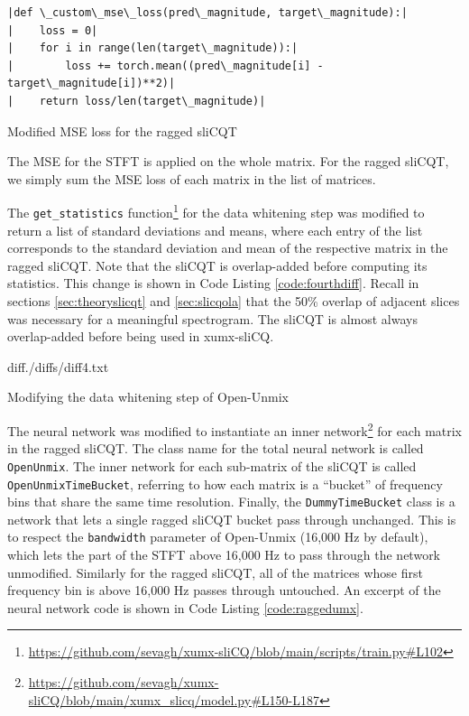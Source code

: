 \documentclass[report.tex]{subfiles}
\begin{document}
\begin{listing}[h]
  \centering
\begin{verbatim}
|def \_custom\_mse\_loss(pred\_magnitude, target\_magnitude):|
|    loss = 0|
|    for i in range(len(target\_magnitude)):|
|        loss += torch.mean((pred\_magnitude[i] - target\_magnitude[i])**2)|
|    return loss/len(target\_magnitude)|
\end{verbatim}
  \caption{Modified MSE loss for the ragged sliCQT}
  \label{code:simplemse}
\end{listing}

The MSE for the STFT is applied on the whole matrix. For the ragged sliCQT, we simply sum the MSE loss of each matrix in the list of matrices.

The \Verb#get_statistics# function\footnote{\url{https://github.com/sevagh/xumx-sliCQ/blob/main/scripts/train.py\#L102}} for the data whitening step was modified to return a list of standard deviations and means, where each entry of the list corresponds to the standard deviation and mean of the respective matrix in the ragged sliCQT. Note that the sliCQT is overlap-added before computing its statistics. This change is shown in Code Listing \ref{code:fourthdiff}. Recall in sections \ref{sec:theoryslicqt} and \ref{sec:slicqola} that the 50\% overlap of adjacent slices was necessary for a meaningful spectrogram. The sliCQT is almost always overlap-added before being used in xumx-sliCQ.

\begin{listing}[ht]
  \centering
\begin{inputminted}[linenos,breaklines,frame=single,fontsize=\scriptsize]{diff}{./diffs/diff4.txt}
\end{inputminted}
  \caption{Modifying the data whitening step of Open-Unmix}
  \label{code:fourthdiff}
\end{listing}

The neural network was modified to instantiate an inner network\footnote{\url{https://github.com/sevagh/xumx-sliCQ/blob/main/xumx_slicq/model.py\#L150-L187}} for each matrix in the ragged sliCQT. The class name for the total neural network is called \Verb#OpenUnmix#. The inner network for each sub-matrix of the sliCQT is called \Verb#OpenUnmixTimeBucket#, referring to how each matrix is a ``bucket'' of frequency bins that share the same time resolution. Finally, the \Verb#DummyTimeBucket# class is a network that lets a single ragged sliCQT bucket pass through unchanged. This is to respect the \Verb#bandwidth# parameter of Open-Unmix (16,000 Hz by default), which lets the part of the STFT above 16,000 Hz to pass through the network unmodified. Similarly for the ragged sliCQT, all of the matrices whose first frequency bin is above 16,000 Hz passes through untouched. An excerpt of the neural network code is shown in Code Listing \ref{code:raggedumx}.
\end{document}
